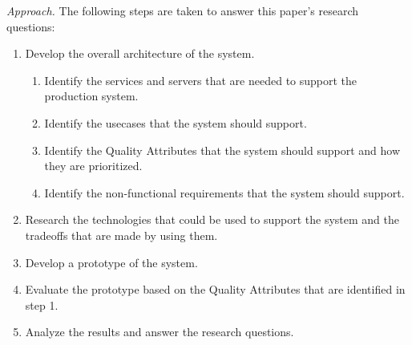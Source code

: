 \emph{Approach.}
The following steps are taken to answer this paper's research questions:
\begin{enumerate}
    \item Develop the overall architecture of the system.
          \begin{enumerate}
              \item Identify the services and servers that are needed to support the production system.
              \item Identify the usecases that the system should support.
              \item Identify the Quality Attributes that the system should support and how they are prioritized.
              \item Identify the non-functional requirements that the system should support.
          \end{enumerate}
    \item Research the technologies that could be used to support the system and the tradeoffs that are made by using them.
    \item Develop a prototype of the system.
    \item Evaluate the prototype based on the Quality Attributes that are identified in step 1.
    \item Analyze the results and answer the research questions.
\end{enumerate}